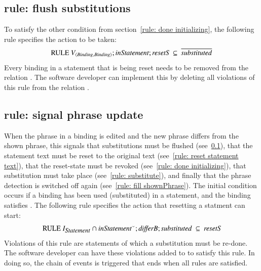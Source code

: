 \documentclass{elsarticle}
\begin{document}
\subsection{rule: flush substitutions}
\label{rule: flush substitutions}
	To satisfy the other condition from section~\ref{rule: done initializing},
	the following rule specifies the action to be taken:
\[\text{RULE}\ \fullt{Binding}{Binding};\id{inStatement} ;\id{resetS}\ \subs\ \overline{\id{substituted} }\]
	Every binding in a statement that is being reset needs to be removed from the relation .
	The software developer can implement this by deleting all violations of this rule from the relation .

\subsection{rule: signal phrase update}
\label{rule: signal phrase update}
	When the phrase in a binding is edited and the new phrase differs from the shown phrase,
	this signals that substitutions must be flushed (see~\ref{rule: flush substitutions}),
	that the statement text must be reset to the original text (see~\ref{rule: reset statement text}),
	that the reset-state must be revoked (see~\ref{rule: done initializing}),
	that substitution must take place (see~\ref{rule: substitute}),
	and finally that the phrase detection is switched off again (see~\ref{rule: fill shownPhrase}).
	The initial condition occurs if a binding has been used (substituted) in a statement,
	and the binding satisfies .
	The following rule specifies the action that resetting a statment can start:
\[\text{RULE}\ \ident{Statement}\cap \flip{\id{inStatement}};\id{{\it differB}};\id{substituted}\ \subs\ \id{resetS} \]
	Violations of this rule are statements of which a substitution must be re-done.
	The software developer can have these violations added to  to satisfy this rule.
	In doing so, the chain of events is triggered that ends when all rules are satisfied.
\end{document}
